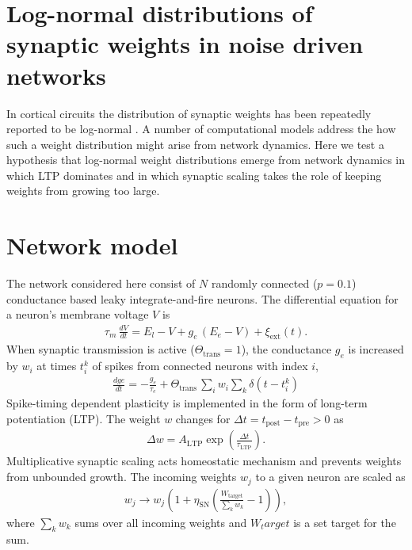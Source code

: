 \columnbreak
\section*{\LARGE Log-normal distributions of synaptic weights in noise driven networks}

In cortical circuits the distribution of synaptic weights has been repeatedly reported to be log-normal \cite{Song2005}. A number of computational models address the how such a weight distribution might arise from network dynamics. Here we test a hypothesis that log-normal weight distributions emerge from network dynamics in which LTP dominates and in which synaptic scaling takes the role of keeping weights from growing too large.

\section*{Network model}

The network considered here consist of $N$ randomly connected ($p=0.1$) conductance based leaky integrate-and-fire neurons. The differential equation for a neuron's membrane voltage $V$ is
%
\begin{align}
 \tau_m\, \frac{dV}{dt}  = E_l - V + g_e \,(E_e - V) +  \xi_{\mathrm{ext}}(t).
\end{align}
%
When synaptic transmission is active ($\Theta_{\text{trans}}=1$), the conductance $g_e$ is increased by $w_i$ at times $t_i^k$ of spikes from connected neurons with index $i$,
%
\begin{align}
 \frac{d ge}{dt} = - \frac{g_e}{\tau_e} +  \Theta_{\text{trans}}\, \sum_i w_i \sum_{k} \delta(t-t_i^k)
\end{align}
%
Spike-timing dependent plasticity is implemented in the form of long-term potentiation (LTP). The weight $w$ changes for $\Delta t = t_{\text{post}}-t_{\text{pre}} > 0$ as
\begin{align}
 \Delta w =  A_{\text{LTP}} \exp\left(\frac{\Delta t}{\tau_{\text{LTP}}}\right).
\end{align}
%
Multiplicative synaptic scaling acts homeostatic mechanism and prevents weights from unbounded growth. The incoming weights $w_j$ to a given neuron are scaled as
%
\begin{align}
 w_j \to w_j \left(1+ \eta_{\text{SN}} \left( \frac{W_{\text{target}}}{\sum_k w_k} -1\right) \right),
\end{align}
%
where $\sum_k w_k$ sums over all incoming weights and $W_target$ is a set target for the sum.



